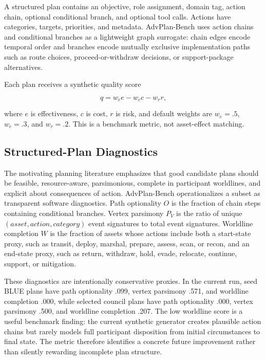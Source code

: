 \documentclass[letterpaper]{article} %
\begin{document}
A structured plan contains an objective, role assignment, domain tag, action chain, optional conditional branch, and optional tool calls. Actions have categories, targets, priorities, and metadata. AdvPlan-Bench uses action chains and conditional branches as a lightweight graph surrogate: chain edges encode temporal order and branches encode mutually exclusive implementation paths such as route choices, proceed-or-withdraw decisions, or support-package alternatives.

Each plan receives a synthetic quality score

\begin{equation}
q = w_e e - w_c c - w_r r,
\end{equation}

where $e$ is effectiveness, $c$ is cost, $r$ is risk, and default weights are $w_e=.5$, $w_c=.3$, and $w_r=.2$. This is a benchmark metric, not asset-effect matching.

\subsection{Structured-Plan Diagnostics}

The motivating planning literature emphasizes that good candidate plans should be feasible, resource-aware, parsimonious, complete in participant worldlines, and explicit about consequences of action. AdvPlan-Bench operationalizes a subset as transparent software diagnostics. Path optionality $O$ is the fraction of chain steps containing conditional branches. Vertex parsimony $P_V$ is the ratio of unique $(asset, action, category)$ event signatures to total event signatures. Worldline completion $W$ is the fraction of assets whose actions include both a start-state proxy, such as transit, deploy, marshal, prepare, assess, scan, or recon, and an end-state proxy, such as return, withdraw, hold, evade, relocate, continue, support, or mitigation.

These diagnostics are intentionally conservative proxies. In the current run, seed BLUE plans have path optionality .099, vertex parsimony .571, and worldline completion .000, while selected council plans have path optionality .000, vertex parsimony .500, and worldline completion .207. The low worldline score is a useful benchmark finding: the current synthetic generator creates plausible action chains but rarely models full participant disposition from initial circumstances to final state. The metric therefore identifies a concrete future improvement rather than silently rewarding incomplete plan structure.
\end{document}
